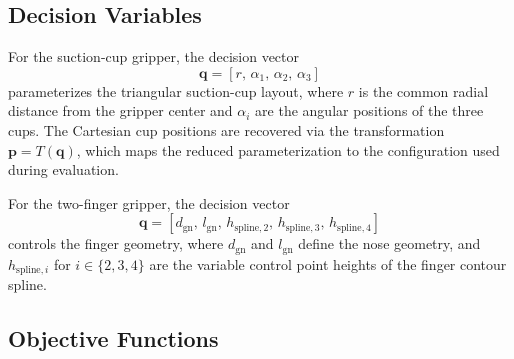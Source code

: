 \subsection{Decision Variables}
\label{subsec:methodology_decision_variables}

For the suction-cup gripper, the decision vector
\begin{equation}
    \mathbf{q} = [r,\, \alpha_1,\, \alpha_2,\, \alpha_3]
\end{equation}
parameterizes the triangular suction-cup layout, where $r$ 
is the common radial distance from the gripper center and $\alpha_i$  are the angular positions of the three cups. The Cartesian cup positions are recovered via the transformation $\mathbf{p} =
T(\mathbf{q})$, 
 which maps the reduced parameterization to the configuration used during
evaluation.

For the two-finger gripper, the decision vector
\begin{equation}
    \mathbf{q} = [d_{\mathrm{gn}},\, l_{\mathrm{gn}},\, h_{\mathrm{spline},2},\, h_{\mathrm{spline},3},\, h_{\mathrm{spline},4}]
\end{equation}
controls the finger geometry, where $d_{\mathrm{gn}}$  and
$l_{\mathrm{gn}}$  define the nose geometry, and
$h_{\mathrm{spline},i}$  for
$i \in \{2,3,4\}$ are the variable control point heights of the finger contour spline.

\subsection{Objective Functions}
\label{subsec:methodology_objectives}

